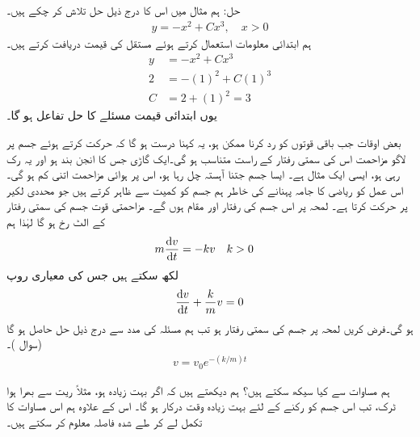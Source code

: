 حل:\quad
ہم  مثال  میں اس کا درج ذیل حل تلاش کر چکے ہیں۔
\begin{align*}
y=-x^2+Cx^3,\quad x>0
\end{align*}
ہم ابتدائی معلومات استعمال کرتے ہوئے مستقل  کی قیمت دریافت کرتے ہیں۔
\begin{align*}
y&=-x^2+Cx^3\\
2&=-(1)^2+C(1)^3\\
C&=2+(1)^2=3
\end{align*}
یوں ابتدائی قیمت مسئلے کا حل تفاعل  ہو گا۔

بعض اوقات جب باقی قوتوں کو رد کرنا ممکن ہو، یہ کہنا درست ہو گا کہ حرکت کرتے ہوئے جسم پر لاگو مزاحمت اس کی سمتی رفتار کے راست متناسب ہو گی۔ایک گاڑی جس کا انجن بند ہو اور یہ رک رہی ہو، ایسی ایک مثال ہے۔ ایسا جسم جتنا آہستہ چل رہا ہو، اس پر ہوائی مزاحمت اتنی کم ہو گی۔ اس عمل کو ریاضی کا جامہ پہنانے کی خاطر ہم جسم کو کمیت  سے ظاہر کرتے ہیں جو محددی لکیر پر حرکت کرتا ہے۔ لمحہ  پر اس جسم کی رفتار  اور مقام  ہوں گے۔ مزاحمتی قوت جسم کی سمتی رفتار کے الٹ رخ ہو گا لہٰذا ہم
\begin{align*}
m\frac{\dif v}{\dif t}&=-kv&& k>0
\end{align*}
لکھ سکتے ہیں جس کی معیاری روپ 
\begin{align*}
\frac{\dif v}{\dif t}+\frac{k}{m}v=0
\end{align*}
ہو گی۔فرض کریں لمحہ  پر جسم کی سمتی رفتار  ہو تب ہم مسئلہ  کی مدد سے  درج ذیل حل حاصل ہو گا (سوال )۔
\begin{align}\label{مساوات_ماورائی_حل_مزاحمت_رفتار_کے_راست}
v=v_0e^{-(k/m)t}
\end{align}

ہم مساوات  سے کیا سیکھ سکتے ہیں؟ ہم دیکھتے ہیں کہ اگر  بہت زیادہ ہو، مثلاً ریت سے بھرا ہوا ٹرک،  تب اس جسم کو رکنے کے لئے بہت زیادہ وقت درکار ہو گا۔ اس کے علاوہ ہم اس مساوات کا تکمل لے کر طے شدہ فاصلہ  معلوم کر سکتے ہیں۔ 

